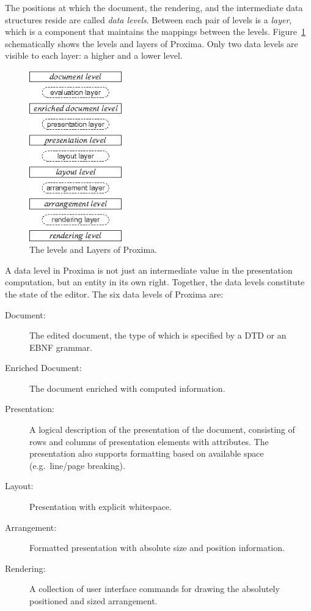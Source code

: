 \documentclass[12pt]{article}
\begin{document}
The positions at which the document, the rendering, and the intermediate data structures reside are called {\em data levels}. Between each pair of levels is a {\em layer}, which is a component that maintains the mappings between the levels. Figure~\ref{fig:levelsAndLayers} schematically shows the levels and layers of Proxima. Only two data levels are visible to each layer: a higher and a lower level.

\begin{figure}[ht]
\centering
\includegraphics[width=4cm]{images/LevelLayerNames}
\caption{The levels and Layers of Proxima.}
\label{fig:levelsAndLayers}
\end{figure}

A data level in Proxima is not just an intermediate value in the presentation computation, but an entity in its own right. Together, the data levels constitute the state of the editor. The six data levels of Proxima are:


\begin{description}
\item[Document:] The edited document, the type of which is specified by a DTD or an EBNF grammar.

\item[Enriched Document:] The document enriched with computed information.

\item[Presentation:] A logical description of the presentation of the document, consisting of rows and columns of presentation elements with attributes. The presentation also supports formatting based on available space (e.g.\ line/page breaking).

\item[Layout:]  Presentation with explicit whitespace.

\item[Arrangement:] Formatted presentation with absolute size and position information.

\item[Rendering:] A collection of user interface commands for drawing the absolutely positioned and sized arrangement.
\end{description}
\end{document}
